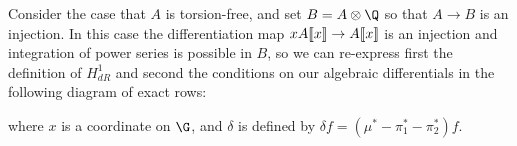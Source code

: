 \begin{example}
Consider the case that \(A\) is torsion-free, and set \(B = A \otimes \Q\) so that \(A \to B\) is an injection.  In this case the differentiation map \(x A\llbracket{x}\rrbracket \to A\llbracket{x}\rrbracket\) is an injection and integration of power series is possible in \(B\), so we can re-express first the definition of \(H^1_{dR}\) and second the conditions on our algebraic differentials in the following diagram of exact rows:
\begin{center}\vspace{-0.8\baselineskip}
\end{center}
where \(x\) is a coordinate on \(\G\), and \(\delta\) is defined by \(\delta f = (\mu^* - \pi_1^* - \pi_2^*)f\).
\end{example}


